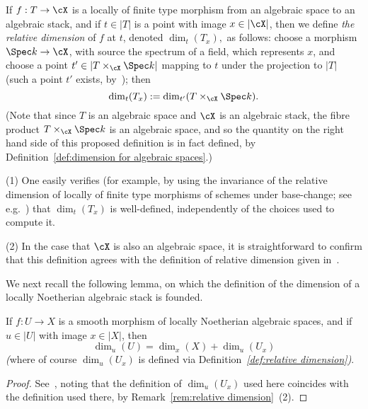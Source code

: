 \begin{adf}
\label{def:relative dimension}
If $f:T \to \cX$ is a locally of finite type morphism from an algebraic space
to an algebraic stack,
and if $t \in |T|$ is a point with image $x \in | \cX|$, then we define 
{\em the relative dimension} of $f$ at $t$, denoted
$\dim_t(T_x),$
as follows: 
choose a morphism $\Spec k \to \cX$, with source the spectrum of 
a field, which represents $x$, and choose a point $t' \in | T\times_{\cX}
\Spec k |$ mapping to $t$ under the projection to $|T|$
(such a point $t'$ exists,
by~\cite[\href{http://stacks.math.columbia.edu/tag/04XH}{Lem.~04XH}]
{stacks-project}); then
$$\dim_t(T_x) := \dim_{t'}(T \times_{\cX} \Spec k ).$$
(Note that since $T$ is an algebraic space and $\cX$ is an algebraic stack,
the fibre product $T\times_{\cX} \Spec k$ is an algebraic space,
and so the quantity on the right hand side of this proposed definition
is in fact defined, by Definition~\ref{def:dimension for algebraic spaces}.)
\end{adf}

\begin{aremark}
\label{rem:relative dimension}
(1) 
One easily verifies (for example, by using the invariance
of the relative dimension of locally of finite type morphisms of schemes
under base-change;
see e.g.~\cite[\href{http://stacks.math.columbia.edu/tag/02FY}{Lem.~02FY}]
{stacks-project})
that $\dim_t(T_x)$ is well-defined, independently of the choices
used to compute it. 

(2)
In the case that $\cX$ is also an algebraic space,
it is straightforward to confirm that this definition agrees with
the definition of relative dimension given 
in~\cite[\href{http://stacks.math.columbia.edu/tag/04NM}{Def.~04NM~(3)}]
{stacks-project}.
\end{aremark}

We next recall the following lemma, on which the definition of
the dimension of a locally Noetherian algebraic stack is founded.


\begin{alemma}
\label{lem:behaviour of dimensions w.r.t. smooth morphisms}
If $f: U \to X$ is a smooth morphism of locally Noetherian algebraic
spaces, and
if $u \in |U|$ with image $x \in |X|$,
then $$\dim_u (U) = \dim_x(X) + \dim_{u} (U_x)$$
{\em (}where of course $\dim_u (U_x)$ is defined via
Definition~{\em \ref{def:relative dimension})}.\end{alemma}
\begin{proof}
See~\cite[\href{http://stacks.math.columbia.edu/tag/0AFI}{Lem.~0AFI}]
{stacks-project},
noting that the definition of $\dim_u (U_x)$ used here coincides with
the definition used there, by Remark~\ref{rem:relative dimension}~(2).
\end{proof}

